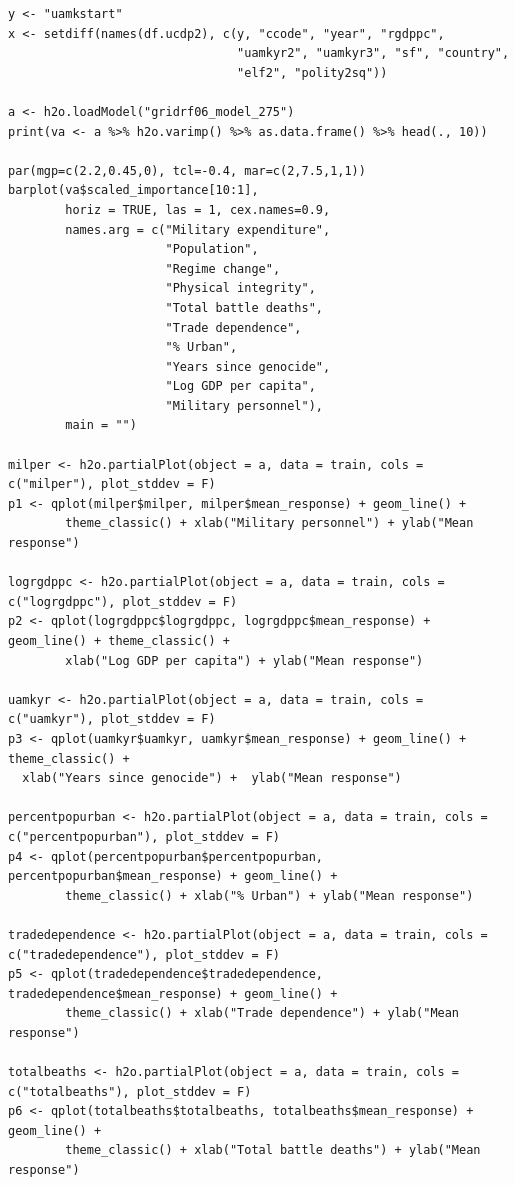 \begin{verbatim}
y <- "uamkstart"
x <- setdiff(names(df.ucdp2), c(y, "ccode", "year", "rgdppc",
                                "uamkyr2", "uamkyr3", "sf", "country",
                                "elf2", "polity2sq")) 

a <- h2o.loadModel("gridrf06_model_275")
print(va <- a %>% h2o.varimp() %>% as.data.frame() %>% head(., 10)) 

par(mgp=c(2.2,0.45,0), tcl=-0.4, mar=c(2,7.5,1,1))
barplot(va$scaled_importance[10:1],
        horiz = TRUE, las = 1, cex.names=0.9,
        names.arg = c("Military expenditure",
                      "Population",
                      "Regime change",
                      "Physical integrity",
                      "Total battle deaths",
                      "Trade dependence",
                      "% Urban", 
                      "Years since genocide", 
                      "Log GDP per capita",
                      "Military personnel"),
        main = "")

milper <- h2o.partialPlot(object = a, data = train, cols = c("milper"), plot_stddev = F)
p1 <- qplot(milper$milper, milper$mean_response) + geom_line() +
        theme_classic() + xlab("Military personnel") + ylab("Mean response")

logrgdppc <- h2o.partialPlot(object = a, data = train, cols = c("logrgdppc"), plot_stddev = F)
p2 <- qplot(logrgdppc$logrgdppc, logrgdppc$mean_response) + geom_line() + theme_classic() +
        xlab("Log GDP per capita") + ylab("Mean response")

uamkyr <- h2o.partialPlot(object = a, data = train, cols = c("uamkyr"), plot_stddev = F)
p3 <- qplot(uamkyr$uamkyr, uamkyr$mean_response) + geom_line() + theme_classic() + 
  xlab("Years since genocide") +  ylab("Mean response")

percentpopurban <- h2o.partialPlot(object = a, data = train, cols = c("percentpopurban"), plot_stddev = F)
p4 <- qplot(percentpopurban$percentpopurban, percentpopurban$mean_response) + geom_line() +
        theme_classic() + xlab("% Urban") + ylab("Mean response")

tradedependence <- h2o.partialPlot(object = a, data = train, cols = c("tradedependence"), plot_stddev = F)
p5 <- qplot(tradedependence$tradedependence, tradedependence$mean_response) + geom_line() +
        theme_classic() + xlab("Trade dependence") + ylab("Mean response")

totalbeaths <- h2o.partialPlot(object = a, data = train, cols = c("totalbeaths"), plot_stddev = F)
p6 <- qplot(totalbeaths$totalbeaths, totalbeaths$mean_response) + geom_line() +
        theme_classic() + xlab("Total battle deaths") + ylab("Mean response")


\end{verbatim}
